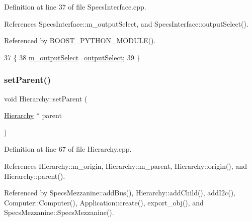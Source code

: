 Definition at line 37 of file Specs\+Interface.\+cpp.



References Specs\+Interface\+::m\+\_\+output\+Select, and Specs\+Interface\+::output\+Select().



Referenced by B\+O\+O\+S\+T\+\_\+\+P\+Y\+T\+H\+O\+N\+\_\+\+M\+O\+D\+U\+L\+E().


\begin{DoxyCode}
37                                                               \{
38     \hyperlink{classSpecsInterface_a660cb4112ce1c071f277cb6ec115b411}{m\_outputSelect}=\hyperlink{classSpecsInterface_ab291ed03f4c2f0143e14c26ad5f648dd}{outputSelect};
39 \}
\end{DoxyCode}
\mbox{\label{classHierarchy_a585ad1aeec16077a0e532ab8b4fc557b}} 
\subsubsection{\texorpdfstring{set\+Parent()}{setParent()}}
{\footnotesize\ttfamily void Hierarchy\+::set\+Parent (\begin{DoxyParamCaption}\item[{\hyperlink{classHierarchy}{Hierarchy} $\ast$}]{parent }\end{DoxyParamCaption})\hspace{0.3cm}{\ttfamily [inherited]}}



Definition at line 67 of file Hierarchy.\+cpp.



References Hierarchy\+::m\+\_\+origin, Hierarchy\+::m\+\_\+parent, Hierarchy\+::origin(), and Hierarchy\+::parent().



Referenced by Specs\+Mezzanine\+::add\+Bus(), Hierarchy\+::add\+Child(), add\+I2c(), Computer\+::\+Computer(), Application\+::create(), export\+\_\+obj(), and Specs\+Mezzanine\+::\+Specs\+Mezzanine().



